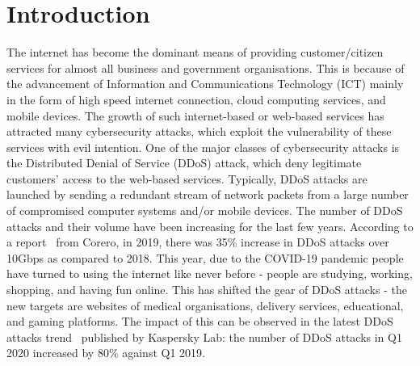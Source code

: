 \section{Introduction}
\label{sec:introduction}
\noindent The internet has become the dominant means of providing customer/citizen services for almost all business and government organisations. This is because of the advancement of Information and Communications Technology (ICT) mainly in the form of high speed internet connection, cloud computing services, and mobile devices. The growth of such internet-based or web-based services has attracted many cybersecurity attacks, which exploit the vulnerability of these services with evil intention. One of the major classes of cybersecurity attacks is the Distributed Denial of Service (DDoS) attack, which deny legitimate customers' access to the web-based services. Typically, DDoS attacks are launched by sending a redundant stream of network packets from a large number of compromised computer systems and/or mobile devices. 
The number of DDoS attacks and their volume have been increasing for the last few years. According to a report~\cite{coreo2} from Corero, in 2019, there was 35\% increase in DDoS attacks over 10Gbps as compared to 2018. This year, due to the COVID-19 pandemic people have turned to using the internet like never before - people are studying, working, shopping, and having fun online. This has shifted the gear of DDoS attacks - the new targets are websites of medical organisations, delivery services, educational, and gaming platforms. The impact of this can be observed in the latest DDoS attacks trend~\cite{kas} published by Kaspersky Lab: the number of DDoS attacks in Q1 2020 increased by 80\% against Q1 2019.  

